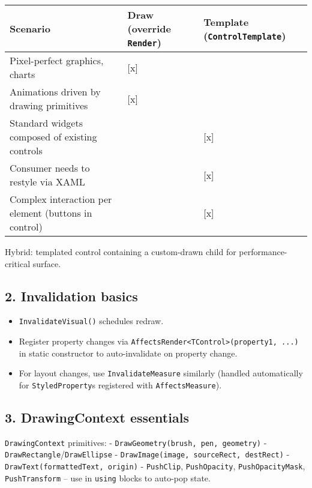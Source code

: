 \begin{longtable}[]{@{}lll@{}}
\toprule\noalign{}
Scenario & Draw (override \passthrough{\lstinline!Render!}) & Template
(\passthrough{\lstinline!ControlTemplate!}) \\
\midrule\noalign{}
\endhead
\bottomrule\noalign{}
\endlastfoot
Pixel-perfect graphics, charts & {[}x{]} & \\
Animations driven by drawing primitives & {[}x{]} & \\
Standard widgets composed of existing controls & & {[}x{]} \\
Consumer needs to restyle via XAML & & {[}x{]} \\
Complex interaction per element (buttons in control) & & {[}x{]} \\
\end{longtable}

Hybrid: templated control containing a custom-drawn child for
performance-critical surface.

\subsection{2. Invalidation basics}\label{invalidation-basics}

\begin{itemize}
\tightlist
\item
  \passthrough{\lstinline!InvalidateVisual()!} schedules redraw.
\item
  Register property changes via
  \passthrough{\lstinline!AffectsRender<TControl>(property1, ...)!} in
  static constructor to auto-invalidate on property change.
\item
  For layout changes, use \passthrough{\lstinline!InvalidateMeasure!}
  similarly (handled automatically for
  \passthrough{\lstinline!StyledProperty!}s registered with
  \passthrough{\lstinline!AffectsMeasure!}).
\end{itemize}

\subsection{3. DrawingContext
essentials}\label{drawingcontext-essentials}

\passthrough{\lstinline!DrawingContext!} primitives: -
\passthrough{\lstinline!DrawGeometry(brush, pen, geometry)!} -
\passthrough{\lstinline!DrawRectangle!}/\passthrough{\lstinline!DrawEllipse!}
- \passthrough{\lstinline!DrawImage(image, sourceRect, destRect)!} -
\passthrough{\lstinline!DrawText(formattedText, origin)!} -
\passthrough{\lstinline!PushClip!},
\passthrough{\lstinline!PushOpacity!},
\passthrough{\lstinline!PushOpacityMask!},
\passthrough{\lstinline!PushTransform!} -- use in
\passthrough{\lstinline!using!} blocks to auto-pop state.

